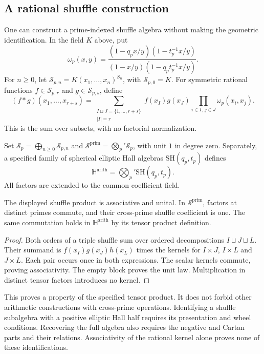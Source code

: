 \subsection{A rational shuffle construction}
\label{v4-arith:et:shuffle-uncoupled}

One can construct a prime-indexed shuffle algebra without making
the geometric identification. In the field $K$ above, put
\[
 \omega_p(x,y)=
 \frac{(1-q_px/y)(1-t_p^{-1}x/y)}
      {(1-x/y)(1-q_pt_p^{-1}x/y)}.
\]
For $n\geq0$, let $\mathscr S_{p,n}=K(x_1,\ldots,x_n)^{S_n}$,
with $\mathscr S_{p,0}=K$. For symmetric rational functions
$f\in\mathscr S_{p,r}$ and $g\in\mathscr S_{p,s}$, define
\[
 (f*g)(x_1,\ldots,x_{r+s})=
 \sum_{\substack{I\sqcup J=\{1,\ldots,r+s\}\\|I|=r}}
 f(x_I)g(x_J)\prod_{i\in I,\,j\in J}\omega_p(x_i,x_j).
\]
This is the sum over subsets, with no factorial normalization.

\begin{definition}\label{v4-arith:def:arithmetic-hall}
Set $\mathscr S_p=\bigoplus_{n\geq0}\mathscr S_{p,n}$ and
$\mathscr S^{\mathrm{prim}}=\bigotimes_p'\mathscr S_p$, with
unit $1$ in degree zero. Separately, a specified family of
spherical elliptic Hall algebras $\mathrm{SH}(q_p,t_p)$ defines
\[
 \mathbb H^{\mathrm{arith}}=
       \bigotimes_p'\mathrm{SH}(q_p,t_p).
\]
All factors are extended to the common coefficient field.
\end{definition}

\begin{proposition}\label{v4-arith:thm:shuffle-uncoupled}
The displayed shuffle product is associative and unital.
In $\mathscr S^{\mathrm{prim}}$, factors at distinct primes commute,
and their cross-prime shuffle coefficient is one. The same
commutation holds in $\mathbb H^{\mathrm{arith}}$ by its tensor
product definition.
\end{proposition}
\begin{proof}
Both orders of a triple shuffle sum over ordered decompositions
$I\sqcup J\sqcup L$. Their summand is $f(x_I)g(x_J)h(x_L)$
times the kernels for $I\times J$, $I\times L$ and $J\times L$.
Each pair occurs once in both expressions. The scalar kernels
commute, proving associativity. The empty block proves the unit
law. Multiplication in distinct tensor factors introduces no kernel.
\end{proof}

This proves a property of the specified tensor product. It does
not forbid other arithmetic constructions with cross-prime
operations. Identifying a shuffle subalgebra with a positive
elliptic Hall half requires its presentation and wheel conditions.
Recovering the full algebra also requires the negative and Cartan
parts and their relations. Associativity of the rational kernel
alone proves none of these identifications.

